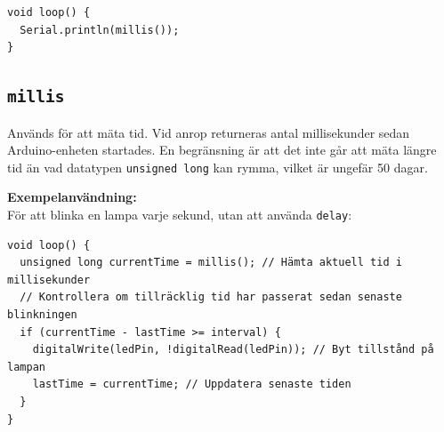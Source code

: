 \documentclass[11pt]{article}
\begin{document}
\begin{lstlisting}
void loop() {
  Serial.println(millis());
}
\end{lstlisting}

\subsection{\texttt{millis}}\label{sec:millis}
Används för att mäta tid. Vid anrop returneras antal millisekunder sedan
Arduino-enheten startades. En begränsning är att det inte går att mäta längre
tid än vad datatypen \texttt{unsigned long} kan rymma, vilket är ungefär 50
dagar.

\textbf{Exempelanvändning:}\\
För att blinka en lampa varje sekund, utan att använda \texttt{delay}:
\begin{lstlisting}
void loop() {
  unsigned long currentTime = millis(); // Hämta aktuell tid i millisekunder
  // Kontrollera om tillräcklig tid har passerat sedan senaste blinkningen
  if (currentTime - lastTime >= interval) {
    digitalWrite(ledPin, !digitalRead(ledPin)); // Byt tillstånd på lampan
    lastTime = currentTime; // Uppdatera senaste tiden
  }
}
\end{lstlisting}
\end{document}

